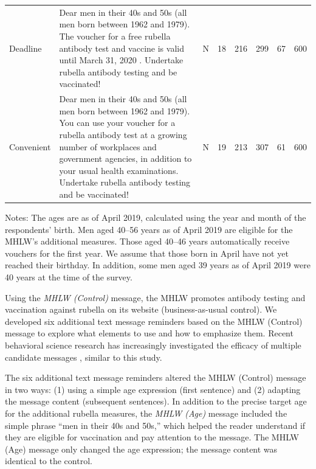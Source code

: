 \documentclass[
      12pt,
    a4paper
]{article}
\begin{document}
\begin{table}
\begin{threeparttable}
\begin{tabular}[t]{l>{\raggedright\arraybackslash}p{20em}cccccc}
\addlinespace
Deadline & Dear men in their 40s and 50s (all men born between 1962 and 1979). The voucher for a free rubella antibody test and vaccine is valid until March 31, 2020 . Undertake rubella antibody testing and be vaccinated! & N & 18 & 216 & 299 & 67 & 600\\
\addlinespace
Convenient & Dear men in their 40s and 50s (all men born between 1962 and 1979). You can use your voucher for a rubella antibody test at a growing number of workplaces and government agencies, in addition to your usual health examinations. Undertake rubella antibody testing and be vaccinated! & N & 19 & 213 & 307 & 61 & 600\\
\bottomrule
\end{tabular}
\begin{tablenotes}
\item Notes: The ages are as of April 2019, calculated using the year and month of the respondents' birth. Men aged 40--56 years as of April 2019 are eligible for the MHLW's additional measures. Those aged 40--46 years automatically receive vouchers for the first year. We assume that those born in April have not yet reached their birthday. In addition, some men aged 39 years as of April 2019 were 40 years at the time of the survey.
\end{tablenotes}
\end{threeparttable}
\end{table}

Using the \emph{MHLW (Control)} message, the MHLW promotes antibody testing and vaccination against rubella on its website (business-as-usual control). We developed six additional text message reminders based on the MHLW (Control) message to explore what elements to use and how to emphasize them. Recent behavioral science research has increasingly investigated the efficacy of multiple candidate messages \citep[e.g.,][]{Dai2021, Milkman2021}, similar to this study.

The six additional text message reminders altered the MHLW (Control) message in two ways: (1) using a simple age expression (first sentence) and (2) adapting the message content (subsequent sentences). In addition to the precise target age for the additional rubella measures, the \emph{MHLW (Age)} message included the simple phrase ``men in their 40s and 50s,'' which helped the reader understand if they are eligible for vaccination and pay attention to the message. The MHLW (Age) message only changed the age expression; the message content was identical to the control.
\end{document}
